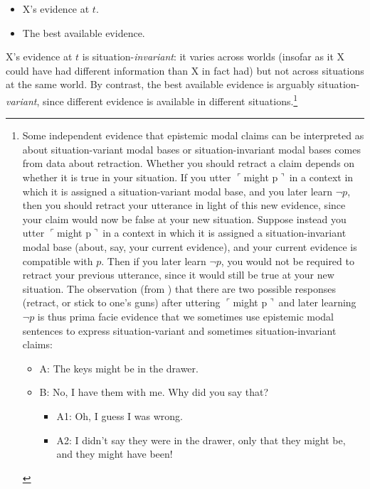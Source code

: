 \documentclass[11pt]{article}
\newcommand{\bitem}{\begin{itemize}}
\newcommand{\eitem}{\end{itemize}}
\newcommand{\ul}{$\ulcorner$}
\newcommand{\ur}{$\urcorner\ $}
\begin{document}
\begin{doublespace}
\begin{itemize}
\item X's evidence at $t$.
\item The best available evidence.
\end{itemize}

\noindent X's evidence at $t$ is situation-\textit{invariant}: it varies across worlds (insofar as it X could have had different information than X in fact had) but not across situations at the same world. By contrast, the best available evidence is arguably situation-\textit{variant}, since different evidence is available in different situations.\footnote{Some independent evidence that epistemic modal claims can be interpreted as about situation-variant modal bases or situation-invariant modal bases comes from data about retraction. Whether you should retract a claim depends on whether it is true in your situation. If you utter \ul might p\ur in a context in which it is assigned a situation-variant modal base, and you later learn $\lnot p$, then you should retract your utterance in light of this new evidence, since your claim would now be false at your new situation. Suppose instead you utter \ul might p\ur in a context in which it is assigned a situation-invariant modal base (about, say, your current evidence), and your current evidence is compatible with $p$. Then if you later learn $\lnot p$, you would not be required to retract your previous utterance, since it would still be true at your new situation. The observation (from \citealt{fintelgillies:2011}) that there are two possible responses (retract, or stick to one's guns) after uttering \ul might p\ur and later learning $\lnot p$ is thus prima facie evidence that we sometimes use epistemic modal sentences to express situation-variant and sometimes situation-invariant claims:

\begin{itemize}
\item[] A:  The keys might be in the drawer. 
\item[] B:  No, I have them with me. Why did you say that? 
	\bitem
	\item A1:  Oh, I guess I was wrong. 
	\item A2:  I didn't say they were in the drawer, only that they might be, and they might have been! 
	\eitem 
\end{itemize}

}


\end{doublespace}
\end{document}

